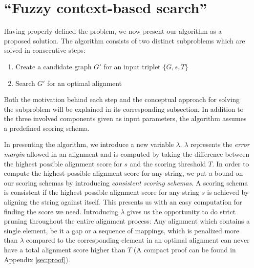 \documentclass[thesis.tex]{subfiles}
\begin{document}
\section{``Fuzzy context-based search''}
Having properly defined the problem, we now present our algorithm as a proposed solution. The algorithm consists of two distinct subproblems which are solved in consecutive steps:
\begin{enumerate}
  \item Create a candidate graph $G'$ for an input triplet $\{G, s, T\}$
  \item Search $G'$ for an optimal alignment
\end{enumerate}
Both the motivation behind each step and the conceptual approach for solving the subproblem will be explained in its corresponding subsection. In addition to the three involved components given as input parameters, the algorithm assumes a predefined scoring schema.\\
\par\noindent
In presenting the algorithm, we introduce a new variable $\lambda$. $\lambda$ represents the \textit{error margin} allowed in an alignment and is computed by taking the difference between the highest possible alignment score for $s$ and the scoring threshold $T$. In order to compute the highest possible alignment score for any string, we put a bound on our scoring schemas by introducing \textit{consistent scoring schemas}. A scoring schema is consistent if the highest possible alignment score for any string $s$ is achieved by aligning the string against itself. This presents us with an easy computation for finding the score we need. Introducing $\lambda$ gives us the opportunity to do strict pruning throughout the entire alignment process: Any alignment which contains a single element, be it a gap or a sequence of mappings, which is penalized more than $\lambda$ compared to the corresponding element in an optimal alignment can never have a total alignment score higher than $T$ (A compact proof can be found in Appendix \ref{sec:proof}).
\end{document}
